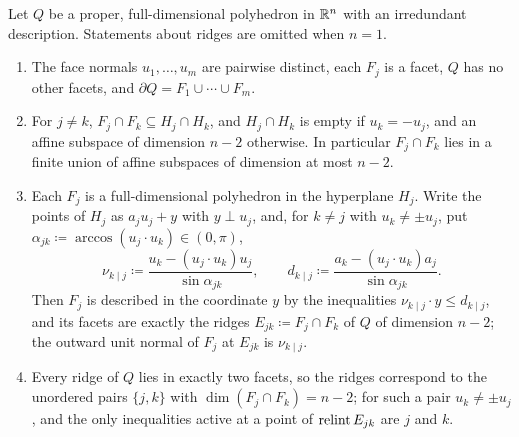 \begin{fact}\label{tb:facets}
Let \(Q\) be a proper, full-dimensional polyhedron in \(\mathbb R^n\) with an
irredundant description. Statements about ridges are omitted when \(n=1\).
\begin{enumerate}
\item[(a)] The face normals \(u_1,\ldots,u_m\) are pairwise distinct, each
\(F_j\) is a facet, \(Q\) has no other facets, and
\(\partial Q=F_1\cup\cdots\cup F_m\).
\item[(b)] For \(j\ne k\), \(F_j\cap F_k\subseteq H_j\cap H_k\), and
\(H_j\cap H_k\) is empty if \(u_k=-u_j\), and an affine subspace of
dimension \(n-2\) otherwise. In particular \(F_j\cap F_k\) lies in a
finite union of affine subspaces of dimension at most \(n-2\).
\item[(c)] Each \(F_j\) is a full-dimensional polyhedron in the hyperplane
\(H_j\). Write the points of \(H_j\) as \(a_ju_j+y\) with \(y\perp u_j\), and,
for \(k\ne j\) with \(u_k\ne\pm u_j\), put
\(\alpha_{jk}\coloneqq \arccos(u_j\cdot u_k)\in(0,\pi)\),
\[
 \nu_{k\mid j}\coloneqq \frac{u_k-(u_j\cdot u_k)u_j}{\sin\alpha_{jk}},\qquad
 d_{k\mid j}\coloneqq \frac{a_k-(u_j\cdot u_k)a_j}{\sin\alpha_{jk}} .
\]
Then \(F_j\) is described in the coordinate \(y\) by the inequalities
\(\nu_{k\mid j}\cdot y\le d_{k\mid j}\), and its facets are exactly the
ridges \(E_{jk}\coloneqq F_j\cap F_k\) of \(Q\) of dimension \(n-2\); the outward
unit normal of \(F_j\) at \(E_{jk}\) is \(\nu_{k\mid j}\).
\item[(d)] Every ridge of \(Q\) lies in exactly two facets, so the ridges
correspond to the unordered pairs \(\{j,k\}\) with
\(\dim(F_j\cap F_k)=n-2\); for such a pair \(u_k\ne\pm u_j\), and the
only inequalities active at a point of \(\operatorname{relint} E_{jk}\) are \(j\) and \(k\).
\end{enumerate}
\end{fact}

